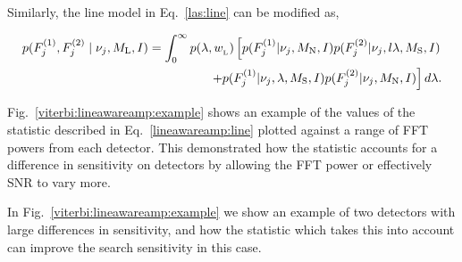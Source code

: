Similarly, the line model in Eq.~\ref{las:line} can be modified as,

\begin{equation}
\label{lineawareamp:line}
\begin{split}
p(F^{(1)}_{j},F^{(2)}_{j} \mid \nu_j,M_{\rm{L}},I) = \int_0^{\infty}  p(\lambda,w_{\rm_L}) 
\left[ p(F^{(1)}_{j}|\nu_j,M_{\rm{N}},I)p(F^{(2)}_{j}|\nu_j,l\lambda,M_{\rm{S}},I) \right. \\
\left. + p(F^{(1)}_{j}|\nu_j,\lambda,M_{\rm{S}},I)p(F^{(2)}_{j}|\nu_j,M_{\rm{N}},I)\right]d\lambda .
\end{split}
\end{equation}

Fig.~\ref{viterbi:lineawareamp:example} shows an example of the values of the statistic described in Eq.~\ref{lineawareamp:line} plotted against a range of \ac{FFT} powers from each detector. This demonstrated how the statistic accounts for a difference in sensitivity on detectors by allowing the \ac{FFT} power or effectively \ac{SNR} to vary more.

In Fig.~\ref{viterbi:lineawareamp:example} we show an example of two detectors with large differences in sensitivity, and how the statistic which takes this into account can improve the search sensitivity in this case.

